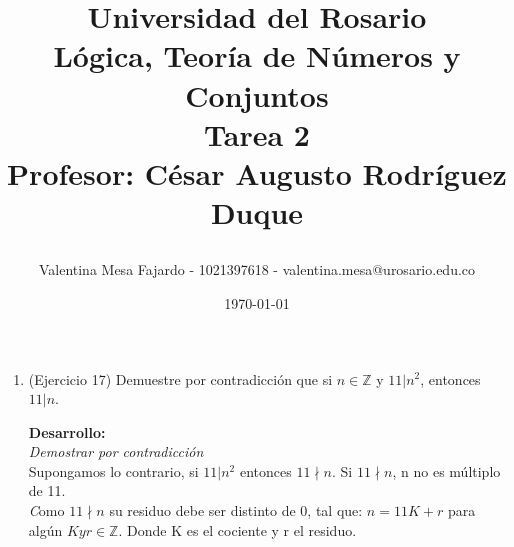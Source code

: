 \documentclass{article}
\title{Universidad del Rosario\\
\textbf{Lógica, Teoría de Números y Conjuntos}\\
\textbf{\Large Tarea 2}\\
\textbf{\large Profesor: César Augusto Rodríguez Duque}\\
\author{Valentina Mesa Fajardo - 1021397618 - valentina.mesa@urosario.edu.co}}
\date{\small\today}
\theoremstyle{definition}
\begin{document}
\maketitle
\thispagestyle{fancy}
\singlespacing
\large

\begin{enumerate}
  \item (Ejercicio 17) Demuestre por contradicción que si $n\in\mathbb{Z}$ y $11|n^{2}$, entonces $11|n$. 
  
  {\centering \textbf{Desarrollo:}\\}
  \textit{Demostrar por contradicción}\\
  Supongamos lo contrario, si $11|n^{2}$ entonces $11\nmid n$. Si $11\nmid n$, n no es múltiplo de 11.\\
  \textit Como $11\nmid n$ su residuo debe ser distinto de 0, tal que: $n=11K +r$ para algún $K y r \in \mathbb{Z}$. Donde K es el cociente y r el residuo.\\
  

\end{enumerate}
\end{document}
